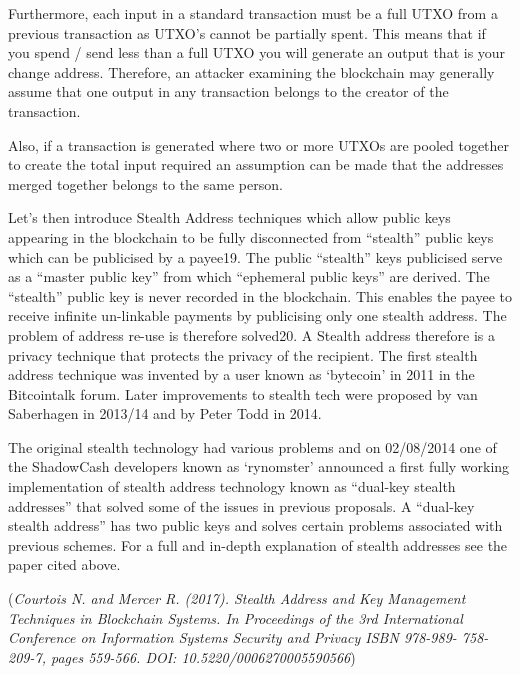 Furthermore, each input in a standard transaction must be a full UTXO
from a previous transaction as UTXO’s cannot be partially spent. This
means that if you spend / send less than a full UTXO you will generate
an output that is your change address. Therefore, an attacker examining
the blockchain may generally assume that one output in any transaction
belongs to the creator of the transaction.



Also, if a transaction is generated where two or more UTXOs are pooled
together to create the total input required an assumption can be made
that the addresses merged together belongs to the same person.



Let’s then introduce Stealth Address techniques which allow public keys
appearing in the blockchain to be fully disconnected from “stealth” public
keys which can be publicised by a payee19. The public “stealth” keys
publicised serve as a “master public key” from which “ephemeral public
keys” are derived. The “stealth” public key is never recorded in the
blockchain. This enables the payee to receive infinite un-linkable
payments by publicising only one stealth address. The problem of address
re-use is therefore solved20. A Stealth address therefore is a privacy
technique that protects the privacy of the recipient. The first stealth
address technique was invented by a user known as ‘bytecoin’ in 2011 in
the Bitcointalk forum. Later improvements to stealth tech were proposed
by van Saberhagen in 2013/14 and by Peter Todd in 2014.



The original stealth technology had various problems and on 02/08/2014 one
of the ShadowCash developers known as ‘rynomster’ announced a first fully
working implementation of stealth address technology known as “dual-key
stealth addresses” that solved some of the issues in previous proposals.
A “dual-key stealth address” has two public keys and solves certain problems
associated with previous schemes. For a full and in-depth explanation of
stealth addresses see the paper cited above.



(\textit{Courtois N. and Mercer R. (2017). Stealth Address and Key Management
Techniques in Blockchain Systems. In Proceedings of the 3rd International
Conference on Information Systems Security and Privacy ISBN 978-989-
758-209-7, pages 559-566. DOI: 10.5220/0006270005590566})



